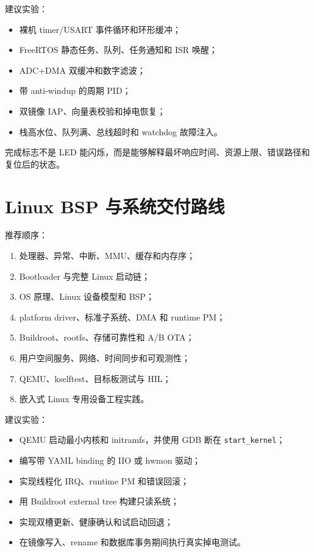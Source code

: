 建议实验：
\begin{itemize}
  \item 裸机 timer/USART 事件循环和环形缓冲；
  \item FreeRTOS 静态任务、队列、任务通知和 ISR 唤醒；
  \item ADC+DMA 双缓冲和数字滤波；
  \item 带 anti-windup 的周期 PID；
  \item 双镜像 IAP、向量表校验和掉电恢复；
  \item 栈高水位、队列满、总线超时和 watchdog 故障注入。
\end{itemize}

完成标志不是 LED 能闪烁，而是能够解释最坏响应时间、资源上限、错误路径和复位后的状态。

\section{Linux BSP 与系统交付路线}

推荐顺序：
\begin{enumerate}
  \item 处理器、异常、中断、MMU、缓存和内存序；
  \item Bootloader 与完整 Linux 启动链；
  \item OS 原理、Linux 设备模型和 BSP；
  \item platform driver、标准子系统、DMA 和 runtime PM；
  \item Buildroot、rootfs、存储可靠性和 A/B OTA；
  \item 用户空间服务、网络、时间同步和可观测性；
  \item QEMU、kselftest、目标板测试与 HIL；
  \item 嵌入式 Linux 专用设备工程实践。
\end{enumerate}

建议实验：
\begin{itemize}
  \item QEMU 启动最小内核和 initramfs，并使用 GDB 断在 \texttt{start\_kernel}；
  \item 编写带 YAML binding 的 IIO 或 hwmon 驱动；
  \item 实现线程化 IRQ、runtime PM 和错误回滚；
  \item 用 Buildroot external tree 构建只读系统；
  \item 实现双槽更新、健康确认和试启动回退；
  \item 在镜像写入、rename 和数据库事务期间执行真实掉电测试。
\end{itemize}

